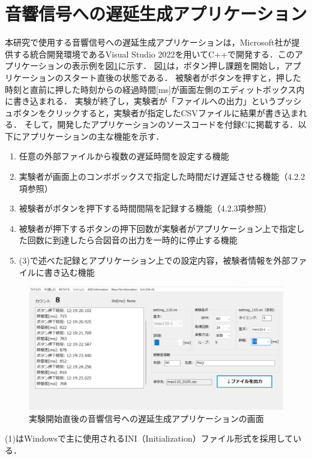 \section{音響信号への遅延生成アプリケーション}
本研究で使用する音響信号への遅延生成アプリケーションは，Microsoft社が提供する統合開発環境であるVisual Studio 2022を用いてC++で開発する．このアプリケーションの表示例を図\ref{fig:app_kyakkann}に示す．
図\ref{fig:app_kyakkann}は，ボタン押し課題を開始し，アプリケーションのスタート直後の状態である．
被験者がボタンを押すと，押した時刻と直前に押した時刻からの経過時間[ms]が画面左側のエディットボックス内に書き込まれる．
実験が終了し，実験者が「ファイルへの出力」というプッシュボタンをクリックすると，実験者が指定したCSVファイルに結果が書き込まれる．
そして，開発したアプリケーションのソースコードを付録Cに掲載する．以下にアプリケーションの主な機能を示す．
\begin{enumerate}[leftmargin=*]
\item 任意の外部ファイルから複数の遅延時間を設定する機能
\item 実験者が画面上のコンボボックスで指定した時間だけ遅延させる機能（4.2.2項参照）
\item 被験者がボタンを押下する時間間隔を記録する機能（4.2.3項参照）
\item 被験者が押下するボタンの押下回数が実験者がアプリケーション上で指定した回数に到達したら合図音の出力を一時的に停止する機能
\item (3)で述べた記録とアプリケーション上での設定内容，被験者情報を外部ファイルに書き込む機能
\end{enumerate}
\begin{figure}[tb]
  \centering
  \includegraphics[scale=0.4]{figures/Apprication/App_kyakkann.pdf}
  \caption{実験開始直後の音響信号への遅延生成アプリケーションの画面}
  \label{fig:app_kyakkann}
\end{figure}
(1)はWindowsで主に使用されるINI（Initialization）ファイル形式を採用している．

